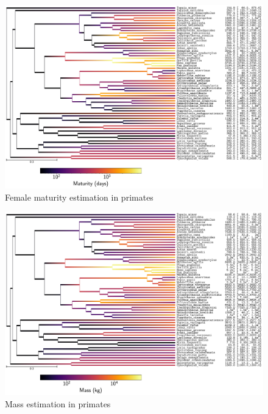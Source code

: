\documentclass{article}
\begin{document}
	\begin{figure}[H]
		\centering
		\includegraphics[width=\linewidth, page=1]{primates/SiteMutSelBranchNe_Logmaturity}
		\caption[Female maturity estimation in primates]{Female maturity estimation in primates}
	\end{figure}

	\begin{figure}[H]
		\centering
		\includegraphics[width=\linewidth, page=1]{primates/SiteMutSelBranchNe_Logmass}
		\caption[Mass estimation in primates]{Mass estimation in primates}
	\end{figure}
\end{document}
